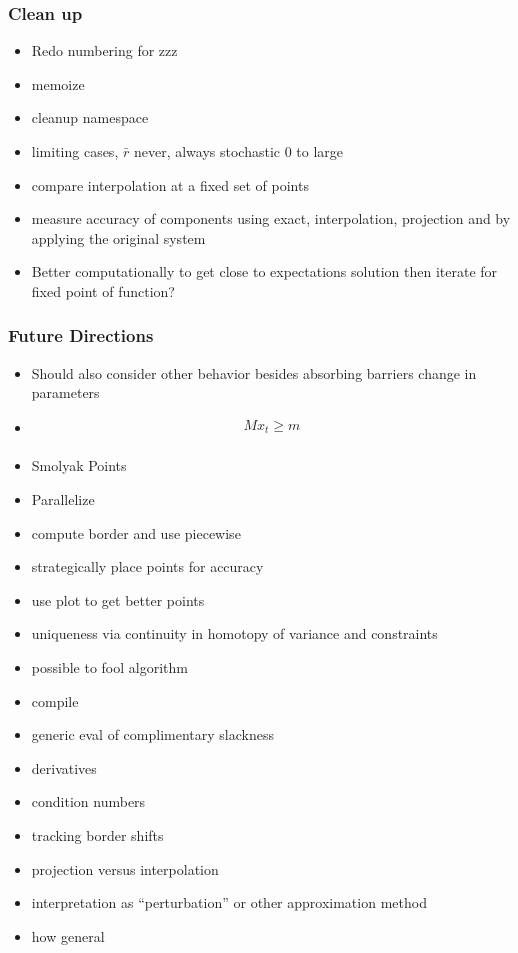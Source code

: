 \documentclass{beamer}
\begin{document}
   \begin{frame}
     \frametitle{Clean up}
     \begin{itemize}
\item Redo numbering for zzz
\item memoize
\item cleanup namespace
\item limiting cases, $\bar{r}$ never, always  stochastic 0 to large
\item compare interpolation at a fixed set of points
\item measure accuracy of components using exact, interpolation, projection and by applying the original system
\item Better computationally to get close to expectations solution then iterate for fixed point of function?
     \end{itemize}
   \end{frame}


   \begin{frame}
     \frametitle{Future Directions}
     \begin{itemize}
     \item Should also consider other behavior besides absorbing barriers change in parameters
     \item  \begin{gather*}
 M x_t \ge m \\
 \end{gather*} 
\item  Smolyak Points \\
\item Parallelize
\item compute border and use piecewise
\item strategically place points for accuracy
\item use plot to get better points
\item uniqueness via continuity in homotopy of variance and constraints
\item possible to fool algorithm
\item compile
\item generic eval of complimentary slackness
\item derivatives
\item condition numbers
\item tracking border shifts
\item projection versus interpolation
\item interpretation as ``perturbation'' or other approximation method
\item how general
     \end{itemize}
   \end{frame}
\end{document}
